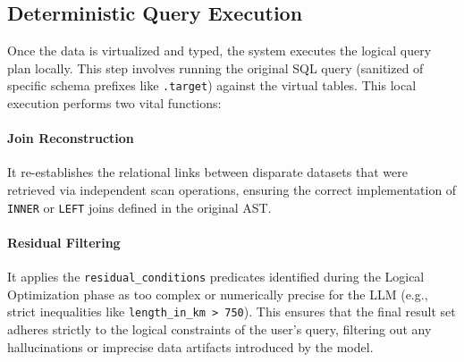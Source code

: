 \subsection{Deterministic Query Execution}
Once the data is virtualized and typed, the system executes the logical query plan locally. This step involves running the original SQL query (sanitized of specific schema prefixes like \texttt{.target}) against the virtual tables. This local execution performs two vital functions:

\paragraph{Join Reconstruction}
It re-establishes the relational links between disparate datasets that were retrieved via independent scan operations, ensuring the correct implementation of \texttt{INNER} or \texttt{LEFT} joins defined in the original AST.

\paragraph{Residual Filtering}
It applies the \texttt{residual\_conditions} predicates identified during the Logical Optimization phase as too complex or numerically precise for the LLM (e.g., strict inequalities like \texttt{length\_in\_km > 750}). This ensures that the final result set adheres strictly to the logical constraints of the user's query, filtering out any hallucinations or imprecise data artifacts introduced by the model.